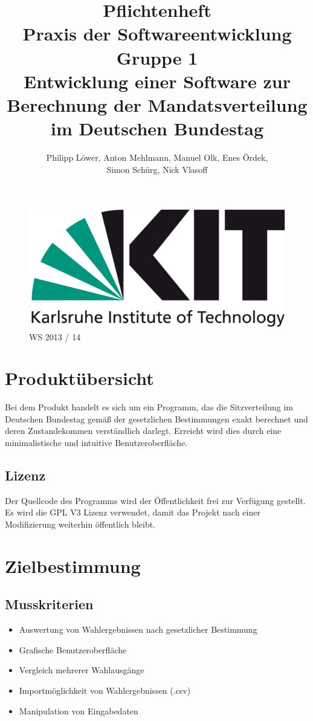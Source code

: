 \documentclass[10pt,a4paper]{article}
\title{\Huge Pflichtenheft\\[1cm] {\bfseries Praxis der Softwareentwicklung}\\Gruppe 1\\[2cm] Entwicklung einer Software zur Berechnung der Mandatsverteilung im Deutschen Bundestag\\[1cm] }
\author{Philipp Löwer, Anton Mehlmann, Manuel Olk, Enes Ördek, \\Simon Schürg, Nick Vlasoff}
\date{}
\begin{document}
\maketitle

\begin{figure}[h]

\centering
		
		\includegraphics[scale=0.6]{KIT-Logo.png}\\
		\Huge WS 2013 / 14
\end{figure}

		
\newpage
\tableofcontents
\newpage

\section{Produktübersicht}
Bei dem Produkt handelt es sich um ein Programm, das die Sitzverteilung im Deutschen Bundestag gemäß der gesetzlichen Bestimmungen exakt berechnet und deren Zustandekommen verständlich darlegt. Erreicht wird dies durch eine minimalistische und intuitive Benutzeroberfläche.

\subsection{Lizenz}
Der Quellcode des Programms wird der Öffentlichkeit frei zur Verfügung gestellt. Es wird die GPL V3 Lizenz verwendet, damit das Projekt nach einer Modifizierung weiterhin öffentlich bleibt.

\section{Zielbestimmung}
\subsection{Musskriterien}
\begin{itemize}
\item Auswertung von Wahlergebnissen nach gesetzlicher Bestimmung
\item Grafische Benutzeroberfläche
\item Vergleich mehrerer Wahlausgänge
\item Importmöglichkeit von Wahlergebnissen (.csv)
\item Manipulation von Eingabedaten
\end{itemize}
\end{document}
